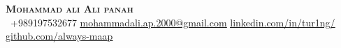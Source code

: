 \begin{center}
    \textbf{\Huge \scshape Mohammad ali Ali panah} \\ \vspace{1pt}
     \ \small +989197532677 \quad
    \href{mailto:mohammadali.ap.2000@gmail.com}{ \underline{mohammadali.ap.2000@gmail.com}} \quad
    \href{https://www.linkedin.com/in/tur1ng/}{ \underline{linkedin.com/in/tur1ng/}} \quad
    \href{https://github.com/always-maap}{ \underline{github.com/always-maap}}
\end{center}